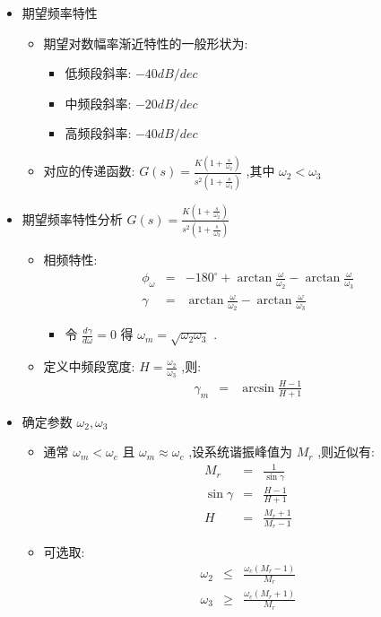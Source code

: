 \documentclass[table]{article}
\begin{document}
\begin{frame}
\begin{itemize}
\begin{itemize}
\begin{itemize}
\begin{itemize}
\begin{itemize}
\begin{itemize}
\item 期望频率特性
\label{sec-2-2-10-2-5-2-6-1-2}%
\begin{itemize}
\item 期望对数幅率渐近特性的一般形状为:
\begin{itemize}
\item 低频段斜率: $-40 dB/dec$
\item 中频段斜率: $-20 dB/dec$
\item 高频段斜率: $-40 dB/dec$
\end{itemize}
\item <2->对应的传递函数:  $G(s)=\frac{K(1+\frac{s}{\omega_2})}{s^2(1+\frac{s}{\omega_3})}$ ,其中 $\omega_2<\omega_3$
\end{itemize}

\item 期望频率特性分析 $G(s)=\frac{K(1+\frac{s}{\omega_2})}{s^2(1+\frac{s}{\omega_3})}$
\label{sec-2-2-10-2-5-2-6-1-3}%
\begin{itemize}
\item 相频特性:
       	    \begin{eqnarray*}
       	    \phi_{\omega} &=& -180^{\circ}+\arctan\frac{\omega}{\omega_2}-\arctan\frac{\omega}{\omega_3} \\
       	    \gamma &=& \arctan\frac{\omega}{\omega_2}-\arctan\frac{\omega}{\omega_3} 
       	    \end{eqnarray*}
\begin{itemize}
\item 令  $\frac{d\gamma}{d\omega}=0$  得  $\omega_m=\sqrt{\omega_2\omega_3}$  .
\end{itemize}
\item <2->定义中频段宽度:  $H=\frac{\omega_2}{\omega_3}$ ,则:
       	    \begin{eqnarray*}
       	    \gamma_m &= &\arcsin\frac{H-1}{H+1} 
       	    \end{eqnarray*}
\end{itemize}

\item 确定参数 $\omega_2,\omega_3$
\label{sec-2-2-10-2-5-2-6-1-4}%
\begin{itemize}
\item 通常  $\omega_m<\omega_c$  且  $\omega_m\approx\omega_c$ ,设系统谐振峰值为  $M_r$  ,则近似有:
       	    \begin{eqnarray*}
       	    M_r &= &\frac{1}{\sin\gamma} \\
       	    \sin\gamma &=& \frac{H-1}{H+1} \\
       	    H &=&\frac{M_r+1}{M_r-1}
       	    \end{eqnarray*}
\item <2->可选取:
       	    \begin{eqnarray*}
       	    \omega_2 & \leq &\frac{\omega_c(M_r-1)}{M_r} \\
       	    \omega_3 & \geq &\frac{\omega_c(M_r+1)}{M_r} 
       	    \end{eqnarray*}
\end{itemize}



\end{itemize}
\end{itemize}
\end{itemize}
\end{itemize}
\end{itemize}
\end{itemize}
\end{frame}
\end{document}
